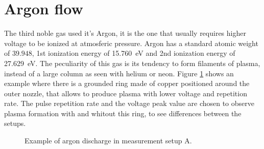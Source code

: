 \section{Argon flow}
The third noble gas used it's Argon, it is the one that usually requires higher voltage to be ionized at atmosferic pressure.
Argon has a standard atomic weight of $\num{39.948}$, 1st ionization energy of \SI{15.760}{\electronvolt} and 2nd ionization energy of \SI{27.629}{\electronvolt}.
The peculiarity of this gas is its tendency to form filaments of plasma, instead of a large column as seen with helium or neon. Figure \ref{fig:argonex} shows an example where there is a grounded ring made of copper positioned around the outer nozzle, that allows to produce plasma with lower voltage and repetition rate. The pulse repetition rate and the voltage peak value are chosen to observe plasma formation with and whitout this ring, to see differences between the setups.
\begin{figure}
 \centering
 \hfill
 \caption{Example of argon discharge in measurement setup A.}
 \label{fig:argonex}
\end{figure}


